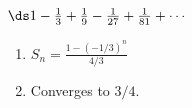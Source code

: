 {$\ds 1-\frac13+\frac19-\frac{1}{27}+\frac{1}{81}+\cdots$
}
{\begin{enumerate}
\item	$S_n = \frac{1-(-1/3)^n}{4/3}$
\item	Converges to $3/4$.
\end{enumerate}
}
